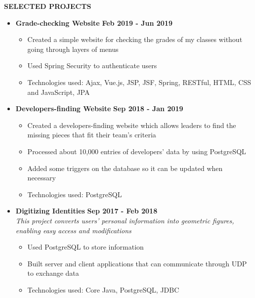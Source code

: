 \documentclass{article}
\newcommand{\cat}[1]{
	\par \noindent\ignorespaces%
	\colorbox[rgb]{0.9, 0.9, 0.9}
	{\begin{minipage}
			[c][1.2\height][c]{\linewidth}{\large\bf #1}
	\end{minipage}}%
}
\begin{document}
	\cat{SELECTED PROJECTS}
	\begin{itemize}
        \item 
		{
			\textbf{Grade-checking Website}
			\hfill
			\textbf{Feb 2019 - Jun 2019} 
			\begin{itemize}
			    \item Created a simple website for checking the grades of my classes without going through layers of menus
			    \item Used Spring Security to authenticate users
			    \item Technologies used: Ajax, Vue.js, JSP, JSF, Spring, RESTful, HTML, CSS and JavaScript, JPA
			\end{itemize}
		}
		\item 
		{
			\textbf{Developers-finding Website}
			\hfill
			\textbf{Sep 2018 - Jan  2019} 
			\begin{itemize}
			    \item Created a developers-finding website which allows leaders to find the missing pieces that fit their team’s criteria
			    \item Processed about 10,000 entries of developers’ data by using PostgreSQL
			    \item Added some triggers on the database so it can be updated when necessary
			    \item Technologies used: PostgreSQL
			\end{itemize}
		}
		\item 
		{
			\textbf{Digitizing Identities}
			\hfill
			\textbf{ Sep  2017 - Feb 2018}\\
			\emph{This project converts users’ personal information into geometric figures, enabling easy access and modifications}
			\begin{itemize}
			    \item Used PostgreSQL to store information
			    \item Built server and client applications that can communicate  through UDP to exchange data
			    \item Technologies used: Core Java, PostgreSQL, JDBC
			\end{itemize}
		}
	\end{itemize}
	
\end{document}
